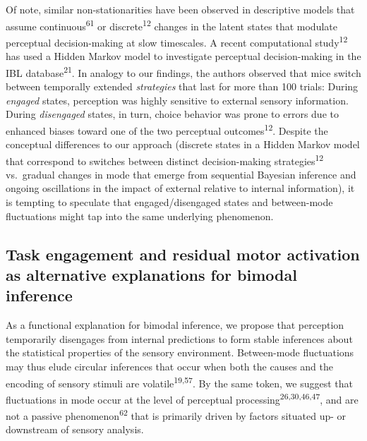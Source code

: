 \documentclass[
]{article}
\begin{document}
Of note, similar non-stationarities have been observed in descriptive
models that assume continuous\textsuperscript{61} or
discrete\textsuperscript{12} changes in the latent states that modulate
perceptual decision-making at slow timescales. A recent computational
study\textsuperscript{12} has used a Hidden Markov model to investigate
perceptual decision-making in the IBL database\textsuperscript{21}. In
analogy to our findings, the authors observed that mice switch between
temporally extended \emph{strategies} that last for more than 100
trials: During \emph{engaged} states, perception was highly sensitive to
external sensory information. During \emph{disengaged} states, in turn,
choice behavior was prone to errors due to enhanced biases toward one of
the two perceptual outcomes\textsuperscript{12}. Despite the conceptual
differences to our approach (discrete states in a Hidden Markov model
that correspond to switches between distinct decision-making
strategies\textsuperscript{12} vs.~gradual changes in mode that emerge
from sequential Bayesian inference and ongoing oscillations in the
impact of external relative to internal information), it is tempting to
speculate that engaged/disengaged states and between-mode fluctuations
might tap into the same underlying phenomenon.

\hypertarget{task-engagement-and-residual-motor-activation-as-alternative-explanations-for-bimodal-inference}{%
\subsection{Task engagement and residual motor activation as alternative
explanations for bimodal
inference}\label{task-engagement-and-residual-motor-activation-as-alternative-explanations-for-bimodal-inference}}

As a functional explanation for bimodal inference, we propose that
perception temporarily disengages from internal predictions to form
stable inferences about the statistical properties of the sensory
environment. Between-mode fluctuations may thus elude circular
inferences that occur when both the causes and the encoding of sensory
stimuli are volatile\textsuperscript{19,57}. By the same token, we
suggest that fluctuations in mode occur at the level of perceptual
processing\textsuperscript{26,30,46,47}, and are not a passive
phenomenon\textsuperscript{62} that is primarily driven by factors situated up- or
downstream of sensory analysis.
\end{document}
